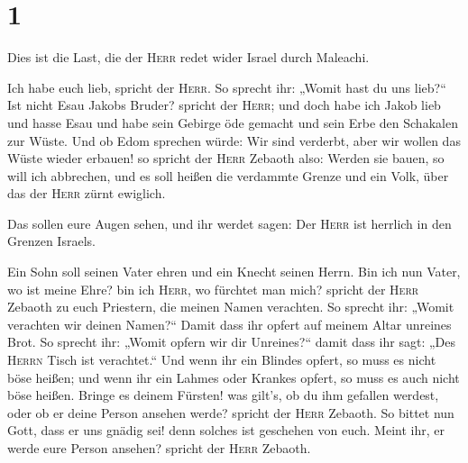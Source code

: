 \hypertarget{section}{%
\section{1}\label{section}}

 Dies ist die Last, die der \textsc{Herr} redet wider
Israel durch Maleachi.

 Ich habe euch lieb, spricht der \textsc{Herr}. So sprecht
ihr: „Womit hast du uns lieb?{}`` Ist nicht Esau Jakobs Bruder? spricht
der \textsc{Herr}; und doch habe ich Jakob lieb  und hasse
Esau und habe sein Gebirge öde gemacht und sein Erbe den Schakalen zur
Wüste.  Und ob Edom sprechen würde: Wir sind verderbt,
aber wir wollen das Wüste wieder erbauen! so spricht der \textsc{Herr}
Zebaoth also: Werden sie bauen, so will ich abbrechen, und es soll
heißen die verdammte Grenze und ein Volk, über das der \textsc{Herr}
zürnt ewiglich.

 Das sollen eure Augen sehen, und ihr werdet sagen: Der
\textsc{Herr} ist herrlich in den Grenzen Israels.

 Ein Sohn soll seinen Vater ehren und ein Knecht seinen
Herrn. Bin ich nun Vater, wo ist meine Ehre? bin ich \textsc{Herr}, wo
fürchtet man mich? spricht der \textsc{Herr} Zebaoth zu euch Priestern,
die meinen Namen verachten. So sprecht ihr: „Womit verachten wir deinen
Namen?{}``  Damit dass ihr opfert auf meinem Altar
unreines Brot. So sprecht ihr: „Womit opfern wir dir Unreines?{}`` damit
dass ihr sagt: „Des \textsc{Herrn} Tisch ist verachtet.`` 
Und wenn ihr ein Blindes opfert, so muss es nicht böse heißen; und wenn
ihr ein Lahmes oder Krankes opfert, so muss es auch nicht böse heißen.
Bringe es deinem Fürsten! was gilt's, ob du ihm gefallen werdest, oder
ob er deine Person ansehen werde? spricht der \textsc{Herr} Zebaoth.
 So bittet nun Gott, dass er uns gnädig sei! denn solches
ist geschehen von euch. Meint ihr, er werde eure Person ansehen? spricht
der \textsc{Herr} Zebaoth.

